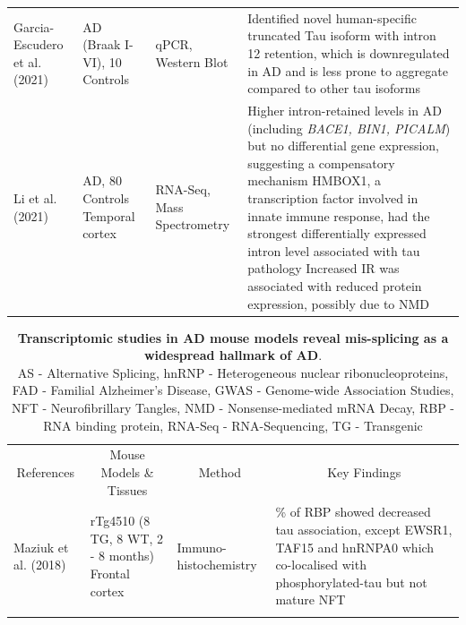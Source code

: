 \begin{changemargin}{1.5cm}
\begin{landscape}
\begin{longtable}[c]{p{3cm}p{4cm}p{3cm}p{16cm}}
			\centering Garcia-Escudero et al. (2021) \cite{Garcia-Escudero2021} &
			\centering 32 AD (Braak I-VI), 10 Controls &
			\centering qPCR, Western Blot &
			\tabitem Identified novel human-specific truncated Tau isoform with intron 12 retention, which is downregulated in AD and is less prone to aggregate compared to other tau isoforms \\
			\hdashline[0.5pt/5pt]
			
			\centering Li et al. (2021) \cite{Li2021} &
			\centering 84 AD, 80 Controls \newline Temporal cortex &
			\centering RNA-Seq, Mass Spectrometry &
			\tabitem Higher intron-retained levels in AD (including \textit{BACE1, BIN1, PICALM}) but no differential gene expression, suggesting a compensatory mechanism \newline
			\tabitem HMBOX1, a transcription factor involved in innate immune response, had the strongest  differentially expressed intron level associated with tau pathology \newline
			\tabitem Increased IR was associated with reduced protein expression, possibly due to NMD \\* \bottomrule
		\end{longtable}

		\begin{longtable}[c]{p{3cm}p{4cm}p{3cm}p{16cm}}
			\captionsetup{width=1.6\textwidth}
			\caption[Transcriptomic studies in AD mouse models]%
			{\textbf{Transcriptomic studies in AD mouse models reveal mis-splicing as a widespread hallmark of AD}. \newline AS - Alternative Splicing, hnRNP - Heterogeneous nuclear ribonucleoproteins, FAD - Familial Alzheimer's Disease, GWAS - Genome-wide Association Studies, NFT - Neurofibrillary Tangles, NMD - Nonsense-mediated mRNA Decay, RBP - RNA binding protein, RNA-Seq - RNA-Sequencing, TG - Transgenic}
			\label{tab: AS_ADMouse_studies}\\
			\toprule
			\multicolumn{1}{c}{References} &
			\multicolumn{1}{c}{Mouse Models \& Tissues} &
			\multicolumn{1}{c}{Method} &
			\multicolumn{1}{c}{Key Findings} \\* \midrule
			\endfirsthead			\endhead			\bottomrule			\endfoot			\endlastfoot	
			
			\centering Maziuk et al. (2018)\cite{Maziuk2018} &
			\centering rTg4510 (8 TG, 8 WT, 2 - 8 months) Frontal cortex&
			\centering Immuno-\newline histochemistry &
			\tabitem 65\% of RBP showed decreased tau association, except EWSR1, TAF15 and hnRNPA0 which co-localised with phosphorylated-tau but not mature NFT \\
			\hdashline[0.5pt/5pt]
			

\end{longtable}
\end{landscape}
\end{changemargin}
